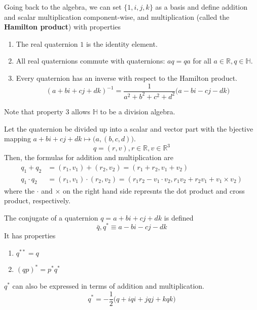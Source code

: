   Going back to the algebra, we can set $\{1, i, j, k\}$ as a basis and define addition and scalar multiplication component-wise, and multiplication (called the \textbf{Hamilton product}) with properties
  \begin{enumerate}
    \item The real quaternion $1$ is the identity element. 
    \item All real quaternions commute with quaternions: $a q = q a$ for all $a \in \mathbb{R}, q \in \mathbb{H}$. 
    \item Every quaternion has an inverse with respect to the Hamilton product. 
      \begin{equation}
        (a + bi + cj + dk)^{-1} = \frac{1}{a^2 + b^2 + c^2 + d^2} \big( a - bi - cj - dk\big)
      \end{equation}
  \end{enumerate}
  Note that property 3 allows $\mathbb{H}$ to be a division algebra. 

  \begin{proposition}
    Let the quaternion be divided up into a scalar and vector part with the bjective mapping $a + bi + cj + dk \mapsto \big(a, (b, c, d)\big)$. 
    \begin{equation}
      q = (r, v), r \in \mathbb{R}, v \in \mathbb{R}^3
    \end{equation}
    Then, the formulas for addition and multiplication are
    \begin{align*}
      q_1 + q_2 & = (r_1, v_1) + (r_2, v_2) = (r_1 + r_2, v_1 + v_2) \\
      q_1 \cdot q_2 & = (r_1, v_1) \cdot (r_2, v_2) = (r_1 r_2 - v_1 \cdot v_2, r_1 v_2 + r_2 v_1 + v_1 \times v_2)
    \end{align*}
    where the $\cdot$ and $\times$ on the right hand side represnts the dot product and cross product, respectively. 
  \end{proposition}

  \begin{definition}
    The conjugate of a quaternion $q = a + bi + cj + dk$ is defined 
    \begin{equation}
      \bar{q}, q^* \equiv a - bi - cj - dk
    \end{equation}
    It has properties
    \begin{enumerate}
      \item $q^{**} = q$
      \item $(q p)^* = p^* q^*$
    \end{enumerate}
    $q^*$ can also be expressed in terms of addition and multiplication. 
    \begin{equation}
      q^* = -\frac{1}{2} \big( q + iqi + jqj + kqk \big)
    \end{equation}
  \end{definition}

